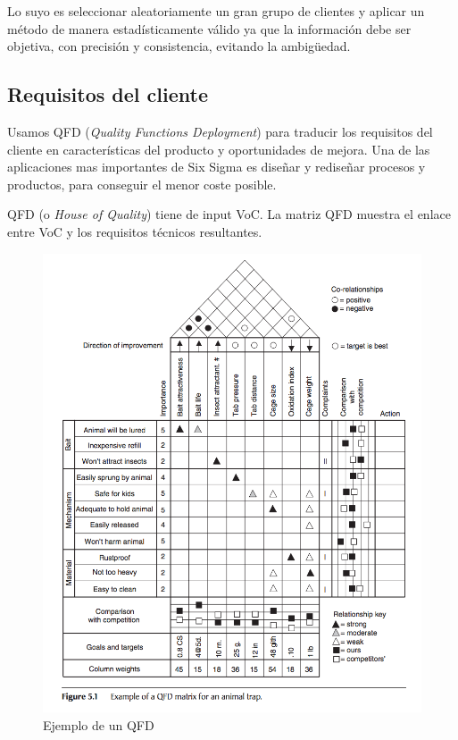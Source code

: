 \documentclass[]{article}
\begin{document}
Lo suyo es seleccionar aleatoriamente un gran grupo de clientes y aplicar un método de manera estadísticamente válido ya que la información debe ser objetiva, con precisión y consistencia, evitando la ambigüedad. 

\subsection{Requisitos del cliente}

Usamos QFD (\textit{Quality Functions Deployment}) para traducir los requisitos del cliente en características del producto y oportunidades de mejora. Una de las aplicaciones mas importantes de Six Sigma es diseñar y rediseñar procesos y productos, para conseguir el menor coste posible.

QFD (o \textit{House of Quality}) tiene de input VoC. La matriz QFD muestra el enlace entre VoC y los requisitos técnicos resultantes.

\begin{figure}[ht!]
	\centering
	\includegraphics[width=150mm]{imagenes/ExampleQFD.png}
	\caption{Ejemplo de un QFD}
	\label{fig:ExampleQFD}
\end{figure}
\end{document}
